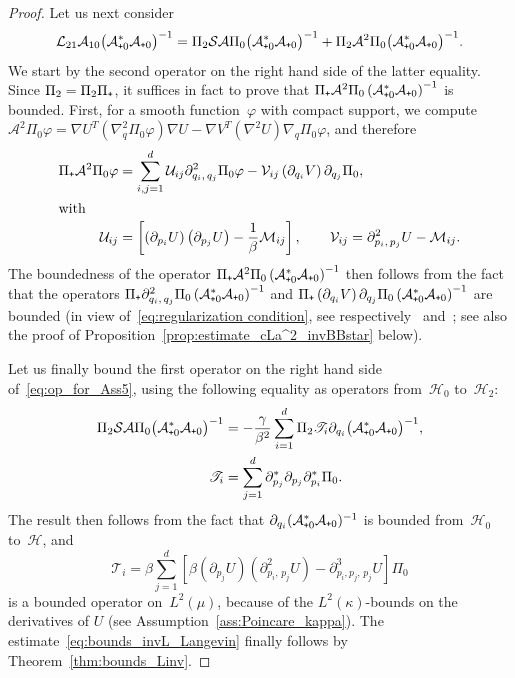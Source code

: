 \documentclass[AHL,Unicode,longabstracts,MathTools,published]{cedram}
\newcommand{\cL}{\mathcal{L}}
\newcommand{\cLs}{\mathcal{S}}
\newcommand{\cLa}{\mathcal{A}}
\newcommand{\cH}{\mathcal{H}}
\newcommand{\cLM}{\mathcal{M}}
\newcommand{\cLU}{\mathcal{U}}
\newcommand{\clV}{\mathcal{V}}
\newcommand{\scrT}{\mathscr{T}}
\newcommand{\subplus}{\textnormal{\texttt{+}}}
\begin{document}
\begin{proof}
Let us next consider
\begin{equation}\label{eq:op_for_Ass5}
\cL_{21}\cLa_{10} \big(\cLa_{\subplus 0}^*\cLa_{\subplus 0}\big)^{-1} = \Pi_2 \cLs \cLa \Pi_0 \big(\cLa_{\subplus 0}^*\cLa_{\subplus 0}\big)^{-1} + \Pi_2 \cLa^2 \Pi_0 \big(\cLa_{\subplus 0}^*\cLa_{\subplus 0}\big)^{-1}.
\end{equation}
We start by the second operator on the right hand side of the latter equality. Since $\Pi_2 = \Pi_2 \Pi_\subplus$, it suffices in fact to prove that $\Pi_\subplus\cLa^2 \Pi_0 \left(\cLa_{\subplus 0}^*\cLa_{\subplus 0}\right)^{-1}$ is bounded. First, for a smooth function~$\varphi$ with compact support, we compute $\cLa^2\Pi_0\varphi = \nabla U^T(\nabla^2_q \Pi_0 \varphi) \nabla U - \nabla V^T (\nabla^2 U) \nabla_q \Pi_0\varphi$, and therefore
\begin{align}
\Pi_\subplus\cLa^2 \Pi_0 \varphi &= \sum_{i,j=1}^d \cLU_{ij} \partial^2_{q_i,\,q_j} \Pi_0 \varphi - \clV_{ij} \left(\partial_{q_i} V\right) \partial_{q_j} \Pi_0,\label{eq:action_cLa2}
\\
\intertext{with}
\cLU_{ij} &= \left[\left(\partial_{p_i} U\right)\left(\partial_{p_j} U\right)-\frac1\beta \cLM_{ij}\right],
\qquad
\clV_{ij} = \partial^2_{p_i,\,p_j}U - \cLM_{ij}.\label{eq:Sij_Tij}
\end{align}
The boundedness of the operator $\Pi_\subplus\cLa^2 \Pi_0
\left(\cLa_{\subplus 0}^*\cLa_{\subplus 0}\right)^{-1}$ then follows from the fact that the operators $\Pi_\subplus\partial^2_{q_i,\,q_j} \Pi_0
\left(\cLa_{\subplus 0}^*\cLa_{\subplus 0}\right)^{-1}$ and $\Pi_\subplus\left(\partial_{q_i} V\right) \partial_{q_j} \Pi_0
\left(\cLa_{\subplus 0}^*\cLa_{\subplus 0}\right)^{-1}$ are bounded (in view of~\eqref{eq:regularization condition}, see respectively~\cite[Proposition~5]{DMS15} and~\cite[Lemma~A.4]{ST18}; see also the proof of Proposition~\ref{prop:estimate_cLa^2_invBBstar} below).

Let us finally bound the first operator on the right hand side of~\eqref{eq:op_for_Ass5}, using the following equality as operators from~$\cH_0$ to~$\cH_2$:
\begin{align*}
\Pi_2 \cLs \cLa \Pi_0 \big(\cLa_{\subplus 0}^*\cLa_{\subplus 0}\big)^{-1} & = -\frac{\gamma}{\beta^2} \sum_{i=1}^d \Pi_2 \scrT_{i} \partial_{q_i} \big(\cLa_{\subplus 0}^*\cLa_{\subplus 0}\big)^{-1},
\\
\scrT_i &= \sum_{j=1}^d \partial_{p_j}^* \partial_{p_j} \partial_{p_i}^* \Pi_0.
\end{align*}
The result then follows from the fact that $\partial_{q_i} (\cLa_{\subplus 0}^*\cLa_{\subplus 0})^{-1}$ is bounded from~$\cH_0$ to~$\cH$, and
\[
\scrT_i = \beta \sum_{j=1}^d \left[\beta \left(\partial_{p_j}U\right)\left(\partial^2_{p_i,\,p_j}U\right) -\partial^3_{p_i, p_j,\,p_j} U\right] \Pi_0
\]
is a bounded operator on~$L^2(\mu)$, because of the $L^2(\kappa)$-bounds on the derivatives of $U$ (see Assumption~\ref{ass:Poincare_kappa}). The estimate~\eqref{eq:bounds_invL_Langevin} finally follows by Theorem~\ref{thm:bounds_Linv}.
\end{proof}
\end{document}
